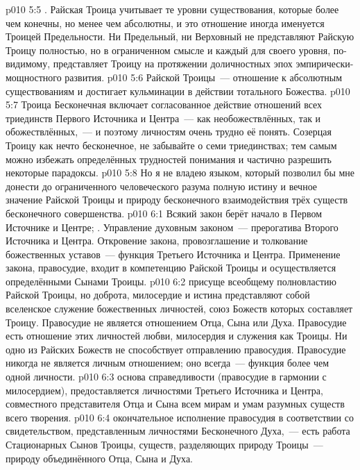 \vs p010 5:5 . Райская Троица учитывает те уровни существования, которые более чем конечны, но менее чем абсолютны, и это отношение иногда именуется Троицей Предельности. Ни Предельный, ни Верховный не представляют Райскую Троицу полностью, но в ограниченном смысле и каждый для своего уровня, по\hyp{}видимому, представляет Троицу на протяжении доличностных эпох эмпирически\hyp{}мощностного развития.
\vs p010 5:6  Райской Троицы~--- отношение к абсолютным существованиям и достигает кульминации в действии тотального Божества.
\vs p010 5:7 \pc Троица Бесконечная включает согласованное действие отношений всех триединств Первого Источника и Центра~--- как необожествлённых, так и обожествлённых,~--- и поэтому личностям очень трудно её понять. Созерцая Троицу как нечто бесконечное, не забывайте о семи триединствах; тем самым можно избежать определённых трудностей понимания и частично разрешить некоторые парадоксы.
\vs p010 5:8 \pc Но я не владею языком, который позволил бы мне донести до ограниченного человеческого разума полную истину и вечное значение Райской Троицы и природу бесконечного взаимодействия трёх существ бесконечного совершенства.
\vs p010 6:1 Всякий закон берёт начало в Первом Источнике и Центре; . Управление духовным законом~--- прерогатива Второго Источника и Центра. Откровение закона, провозглашение и толкование божественных уставов~--- функция Третьего Источника и Центра. Применение закона, правосудие, входит в компетенцию Райской Троицы и осуществляется определёнными Сынами Троицы.
\vs p010 6:2 \pc {} присуще всеобщему полновластию Райской Троицы, но доброта, милосердие и истина представляют собой вселенское служение божественных личностей, союз Божеств которых составляет Троицу. Правосудие не является отношением Отца, Сына или Духа. Правосудие есть отношение этих личностей любви, милосердия и служения как Троицы. Ни одно из Райских Божеств не способствует отправлению правосудия. Правосудие никогда не является личным отношением; оно всегда~--- функция более чем одной личности.
\vs p010 6:3 \pc {} основа справедливости (правосудие в гармонии с милосердием), предоставляется личностями Третьего Источника и Центра, совместного представителя Отца и Сына всем мирам и умам разумных существ всего творения.
\vs p010 6:4 \pc {} окончательное исполнение правосудия в соответствии со свидетельством, представленным личностями Бесконечного Духа,~--- есть работа Стационарных Сынов Троицы, существ, разделяющих природу Троицы~--- природу объединённого Отца, Сына и Духа.
